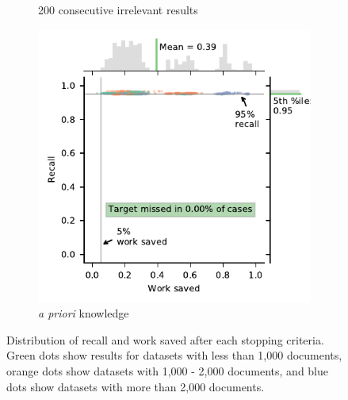 \documentclass{bmcart}
\providecommand{\DIFaddbeginFL}{} %
\providecommand{\DIFaddendFL}{} %
\providecommand{\DIFdelbeginFL}{} %
\providecommand{\DIFdelendFL}{} %
\newcommand{\DIFscaledelfig}{0.5}
\newlength{\DIFdelgraphicswidth} %
\newlength{\DIFdelgraphicsheight} %
\newcommand{\DIFaddincludegraphics}[2][]{{\color{blue}\fbox{\DIFOincludegraphics[#1]{#2}}}} %
\newcommand{\DIFdelincludegraphics}[2][]{%
\sbox{\DIFdelgraphicsbox}{\DIFOincludegraphics[#1]{#2}}%
\settoboxwidth{\DIFdelgraphicswidth}{\DIFdelgraphicsbox} %
\settoboxtotalheight{\DIFdelgraphicsheight}{\DIFdelgraphicsbox} %
\scalebox{\DIFscaledelfig}{%
\parbox[b]{\DIFdelgraphicswidth}{\usebox{\DIFdelgraphicsbox}\\[-\baselineskip] \rule{\DIFdelgraphicswidth}{0em}}\llap{\resizebox{\DIFdelgraphicswidth}{\DIFdelgraphicsheight}{%
\setlength{\unitlength}{\DIFdelgraphicswidth}%
\begin{picture}(1,1)%
\thicklines\linethickness{2pt} %
{\color[rgb]{1,0,0}\put(0,0){\framebox(1,1){}}}%
{\color[rgb]{1,0,0}\put(0,0){\line( 1,1){1}}}%
{\color[rgb]{1,0,0}\put(0,1){\line(1,-1){1}}}%
\end{picture}%
}\hspace*{3pt}}} %
} %
\DeclareRobustCommand{\DIFaddbeginFL}{\DIFOaddbeginFL \let\includegraphics\DIFaddincludegraphics} %
\DeclareRobustCommand{\DIFaddendFL}{\DIFOaddendFL \let\includegraphics\DIFOincludegraphics} %
\DeclareRobustCommand{\DIFdelbeginFL}{\DIFOdelbeginFL \let\includegraphics\DIFdelincludegraphics} %
\DeclareRobustCommand{\DIFdelendFL}{\DIFOaddendFL \let\includegraphics\DIFOincludegraphics} %
\begin{document}
\begin{figure}
\begin{subfigure}[b]{0.475\textwidth}
			\DIFaddendFL \caption[]%
			{{\small 200 consecutive irrelevant results \\}}    
			\label{fig:ih_200}
		\end{subfigure}
		\hfill
		\begin{subfigure}[b]{0.475\textwidth}   
			\centering 
			\DIFdelbeginFL %
\DIFdelendFL \DIFaddbeginFL \includegraphics[width=\textwidth]{2_figs_jointplot_pf.pdf}
			\DIFaddendFL \caption[]%
			{{\footnotesize \textit{a priori} knowledge}}   
			\label{fig:pf}
		\end{subfigure}

		\caption{\small Distribution of recall and work saved after each stopping criteria. Green dots show results for datasets with less than 1,000 documents, orange dots show datasets with 1,000 - 2,000 documents, and blue dots show datasets with more than 2,000 documents.} 
		\label{recall-wss}
	\end{figure}
\end{document}
